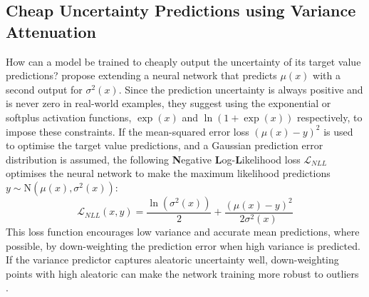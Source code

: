 \subsection{Cheap Uncertainty Predictions using Variance Attenuation} \label{txt:variance-attenuation}

How can a model be trained to cheaply output the uncertainty of its target value predictions? \textcite{nll-loss-1994} propose extending a neural network that predicts $\mu(x)$ with a second output for $\sigma^2(x)$. Since the prediction uncertainty is always positive and is never zero in real-world examples, they suggest using the exponential \cite{nll-loss-1994} or softplus \cite{reliable-variance-2019} activation functions, $\exp(x)$ and $\ln(1 + \exp(x))$ respectively, to impose these constraints. If the mean-squared error loss $(\mu(x) - y)^2$ is used to optimise the target value predictions, and a Gaussian prediction error distribution is assumed, the following \textbf{N}egative \textbf{L}og-\textbf{L}ikelihood loss $\mathcal{L}_{NLL}$ optimises the neural network to make the maximum likelihood predictions $y \sim \text{N}(\mu(x), \sigma^2(x))$:
\begin{equation} \label{eq:nll-loss}
    \mathcal{L}_{NLL}(x, y) = \frac{\ln(\sigma^2(x))}{2} + \frac{(\mu(x) - y)^2}{2 \sigma^2(x)}
\end{equation}
This loss function encourages low variance and accurate mean predictions, where possible, by down-weighting the prediction error when high variance is predicted. If the variance predictor captures aleatoric uncertainty well, down-weighting points with high aleatoric can make the network training more robust to outliers \cite{bayesian-deep-uncertainty-2017}.

